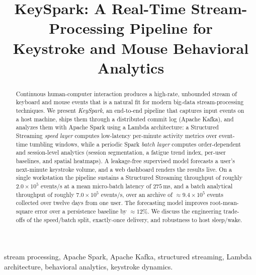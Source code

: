\documentclass[conference]{IEEEtran}
\begin{document}
\title{KeySpark: A Real-Time Stream-Processing Pipeline for\\
Keystroke and Mouse Behavioral Analytics}

\author{
}

\maketitle

\begin{abstract}
Continuous human-computer interaction produces a high-rate, unbounded
stream of keyboard and mouse events that is a natural fit for modern
big-data stream-processing techniques. We present \emph{KeySpark}, an
end-to-end pipeline that captures input events on a host machine, ships
them through a distributed commit log (Apache Kafka), and analyzes them
with Apache Spark using a Lambda architecture: a Structured Streaming
\emph{speed layer} computes low-latency per-minute activity metrics over
event-time tumbling windows, while a periodic Spark \emph{batch layer}
computes order-dependent and session-level analytics (session
segmentation, a fatigue trend index, per-user baselines, and spatial
heatmaps). A leakage-free supervised model forecasts a user's next-minute
keystroke volume, and a web dashboard renders the results live. On a
single workstation the pipeline sustains a Structured Streaming
throughput of roughly $2.0\times10^{5}$ events/s at a mean micro-batch
latency of $275$\,ms, and a batch analytical throughput of roughly
$7.0\times10^{5}$ events/s, over an archive of
$\approx\!9.4\times10^{5}$ events collected over twelve days from one
user. The forecasting model improves root-mean-square error over a
persistence baseline by
$\approx\!12\%$. We discuss the engineering trade-offs of the
speed/batch split, exactly-once delivery, and robustness to host
sleep/wake.
\end{abstract}

\begin{IEEEkeywords}
stream processing, Apache Spark, Apache Kafka, structured streaming,
Lambda architecture, behavioral analytics, keystroke dynamics.
\end{IEEEkeywords}
\end{document}

